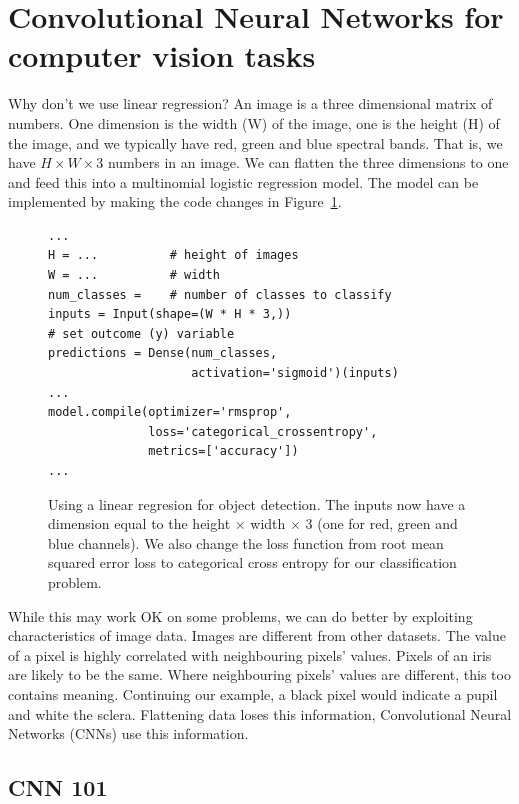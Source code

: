 \documentclass[12pt, a4paper, oneside, headinclude, footinclude]{article}
\begin{document}
\section{Convolutional Neural Networks for computer vision tasks}

Why don't we use linear regression?  An image is a three dimensional matrix of
numbers. One dimension is the width (W) of the image, one is the height (H) of
the image, and we typically have red, green and blue spectral bands. That is,
we have $H\times W \times 3$ numbers in an image. We can flatten the three
dimensions to one and feed this into a multinomial logistic regression model.
The model can be implemented by making the code changes in
Figure~\ref{alg:linearimage}.

\begin{figure}
\begin{verbatim}
...
H = ...          # height of images
W = ...          # width
num_classes =    # number of classes to classify  
inputs = Input(shape=(W * H * 3,))
# set outcome (y) variable
predictions = Dense(num_classes, 
                    activation='sigmoid')(inputs)
...
model.compile(optimizer='rmsprop', 
              loss='categorical_crossentropy', 
              metrics=['accuracy'])
...
\end{verbatim}
    \caption[Using a linear regression for object detection]{Using a linear
    regresion for object detection. The inputs now have a dimension equal to
    the height $\times$ width $\times$ 3 (one for red, green and blue
    channels). We also change the loss function from root mean squared error
    loss to categorical cross entropy for our classification problem.
\label{alg:linearimage}} \end{figure}

While this may work OK on some problems, we can do better by exploiting
characteristics of image data. Images are different from other datasets. The
value of a pixel is highly correlated with neighbouring pixels' values. Pixels
of an iris are likely to be the same. Where neighbouring pixels' values are
different, this too contains meaning. Continuing our example, a black pixel
would indicate a pupil and white the sclera. Flattening data loses
this information, Convolutional Neural Networks (CNNs) use this information.

\subsection{CNN 101}
\end{document}
